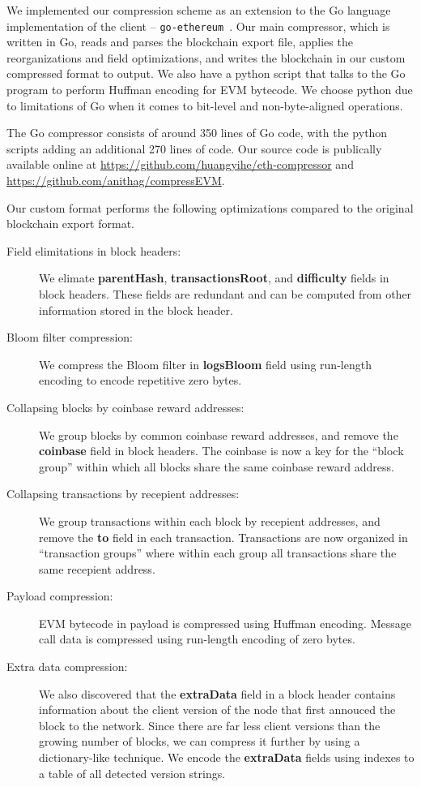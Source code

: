 We implemented our compression scheme as an extension to the Go language implementation of the \eth{} client -- \texttt{go-ethereum}~\cite{go-eth}.
Our main compressor, which is written in Go, reads and parses the blockchain export file,
applies the reorganizations and field optimizations, and writes the blockchain in our custom compressed format to output.
We also have a python script that talks to the Go program to perform Huffman encoding for EVM bytecode.
We choose python due to limitations of Go when it comes to bit-level and non-byte-aligned operations.

The Go compressor consists of around 350 lines of Go code,
with the python scripts adding an additional 270 lines of code.
Our source code is publically available online at
\url{https://github.com/huangyihe/eth-compressor}
and
\url{https://github.com/anithag/compressEVM}.

Our custom format performs the following optimizations compared to the original blockchain export format.

\begin{description}
\item[Field elimitations in block headers:] We elimate \textbf{parentHash}, \textbf{transactionsRoot},
and \textbf{difficulty} fields in block headers. These fields are redundant and can be computed from
other information stored in the block header.

\item[Bloom filter compression:] We compress the Bloom filter in \textbf{logsBloom} field using run-length
encoding to encode repetitive zero bytes.

\item[Collapsing blocks by coinbase reward addresses:] We group blocks by common coinbase reward addresses, and remove
the \textbf{coinbase} field in block headers. The coinbase is now a key for the ``block group'' within which all blocks
share the same coinbase reward address.

\item[Collapsing transactions by recepient addresses:] We group transactions within each block by recepient addresses, and
remove the \textbf{to} field in each transaction. Transactions are now organized in ``transaction groups'' where within
each group all transactions share the same recepient address.

\item[Payload compression:] EVM bytecode in payload is compressed using Huffman encoding. Message call data is compressed
using run-length encoding of zero bytes.

\item[Extra data compression:] We also discovered that the \textbf{extraData} field in a block header contains information
about the client version of the node that first annouced the block to the network. Since there are far less client versions
than the growing number of blocks, we can compress it further by using a dictionary-like technique. We encode the
\textbf{extraData} fields using indexes to a table of all detected version strings.

\end{description}
